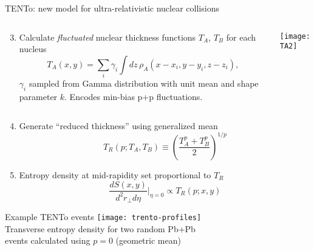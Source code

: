 \documentclass[svgnames]{beamer}
\newcommand{\trento}{T\raisebox{-.5ex}{R}ENTo}
\begin{document}
\begin{frame}{{\trento}: new model for ultra-relativistic nuclear collisions}
\vspace{0.15 in}
 \begin{columns}
 \begin{column}{0.6\textwidth}
  \begin{enumerate}
  \setcounter{enumi}{2}
   \item Calculate \emph{fluctuated} nuclear thickness functions $T_A$, $T_B$ for each nucleus
   {\footnotesize
  \begin{equation}
  T_{A}(x,y) = \sum\limits_i \gamma_i \int dz\, \rho_{A}(x-x_i,y-y_i,z-z_i), \nonumber
  \end{equation}}
  $\gamma_i$ sampled from Gamma distribution with unit mean and shape parameter $k$. Encodes min-bias p+p fluctuations.
  \end{enumerate}
 \vspace{0.1 in}
 \end{column}
 \begin{column}{0.4\textwidth}
 \centering
 \texttt{[image: TA2]}
 \end{column}
 \end{columns}
 
\begin{enumerate}
  \setcounter{enumi}{3}
  \item Generate ``reduced thickness'' using generalized mean
  \begin{equation}
    T_R(p;T_A,T_B) \equiv \left(\frac{T_A^p + T_B^p}{2} \right) ^{1/p} \nonumber
  \end{equation}
 
  \item Entropy density at mid-rapidity set proportional to $T_R$
  \begin{equation}
  \frac{dS(x,y)}{d^2r_\perp d\eta} \bigg \vert_{\eta=0} \propto T_R(p;x,y) \nonumber
  \end{equation}

\end{enumerate}

\end{frame}

\begin{frame}{Example {\trento} events}
\centering
\texttt{[image: trento-profiles]} \\
Transverse entropy density for two random Pb+Pb \\ events calculated using $p=0$ (geometric mean)
\end{frame}
\end{document}
